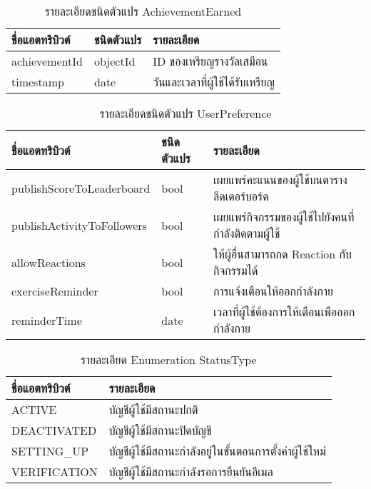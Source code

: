 \begin{table}
    \caption{รายละเอียดชนิดตัวแปร AchievementEarned}
    \begin{tabularx}{\textwidth}{ | l | l | X | }
        \hline
        \bf ชื่อแอตทริบิวต์ & \bf ชนิดตัวแปร & \bf รายละเอียด \\\hline
        achievementId & objectId & ID ของเหรียญรางวัลเสมือน\\\hline
        timestamp & date & วันและเวลาที่ผู้ใช้ได้รับเหรียญ\\\hline 
    \end{tabularx}
\end{table}

\begin{table}
    \caption{รายละเอียดชนิดตัวแปร UserPreference}
    \begin{tabularx}{\textwidth}{ | l | l | X | }
        \hline
        \bf ชื่อแอตทริบิวต์ & \bf ชนิดตัวแปร & \bf รายละเอียด \\\hline
        publishScoreToLeaderboard & bool & เผยแพร่คะแนนของผู้ใช้บนตารางลีดเดอร์บอร์ด\\\hline
        publishActivityToFollowers & bool & เผยแพร่กิจกรรมของผู้ใช้ไปยังคนที่กำลังติดตามผู้ใช้\\\hline
        allowReactions & bool & ให้ผู้อื่นสามารถกด Reaction กับกิจกรรมได้\\\hline
        exerciseReminder & bool & การแจ้งเตือนให้ออกกำลังกาย\\\hline
        reminderTime & date & เวลาที่ผู้ใช้ต้องการให้เตือนเพือออกกำลังกาย\\\hline
    \end{tabularx}
\end{table}

\begin{table}
    \caption{รายละเอียด Enumeration StatusType}
    \begin{tabularx}{\textwidth}{ | l | X | }
        \hline
        \bf ชื่อแอตทริบิวต์ & \bf รายละเอียด \\\hline
        ACTIVE & บัญชีผู้ใช้มีสถานะปกติ\\\hline
        DEACTIVATED & บัญชีผู้ใช้มีสถานะปิดบัญชี\\\hline
        SETTING\_UP & บัญชีผู้ใช้มีสถานะกำลังอยู่ในขั้นตอนการตั้งค่าผู้ใช้ใหม่\\\hline
        VERIFICATION & บัญชีผู้ใช้มีสถานะกำลังรอการยืนยันอีเมล\\\hline
    \end{tabularx}
\end{table}

